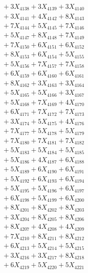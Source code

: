 \documentclass[a4paper,10pt]{article}
\begin{document}
{\begin{align}
&\;  + 3 X_{4138} + 3 X_{4139} + 3 X_{4140} \\[0.3ex]
&\;  + 3 X_{4141} + 4 X_{4142} + 8 X_{4143} \\[0.3ex]
&\;  + 7 X_{4144} + 5 X_{4145} + 7 X_{4146} \\[0.3ex]
&\;  + 5 X_{4147} + 8 X_{4148} + 7 X_{4149} \\[0.5ex]\allowbreak
&\;  + 7 X_{4150} + 6 X_{4151} + 6 X_{4152} \\[0.3ex]
&\;  + 8 X_{4153} + 6 X_{4154} + 5 X_{4155} \\[0.3ex]
&\;  + 5 X_{4156} + 7 X_{4157} + 7 X_{4158} \\[0.3ex]
&\;  + 6 X_{4159} + 6 X_{4160} + 6 X_{4161} \\[0.3ex]
&\;  + 8 X_{4162} + 3 X_{4163} + 3 X_{4164} \\[0.3ex]
&\;  + 5 X_{4165} + 5 X_{4166} + 3 X_{4167} \\[0.3ex]
&\;  + 5 X_{4168} + 7 X_{4169} + 4 X_{4170} \\[0.3ex]
&\;  + 6 X_{4171} + 7 X_{4172} + 7 X_{4173} \\[0.3ex]
&\;  + 3 X_{4174} + 5 X_{4175} + 4 X_{4176} \\[0.3ex]
&\;  + 7 X_{4177} + 5 X_{4178} + 5 X_{4179} \\[0.5ex]\allowbreak
&\;  + 7 X_{4180} + 7 X_{4181} + 7 X_{4182} \\[0.3ex]
&\;  + 5 X_{4183} + 5 X_{4184} + 5 X_{4185} \\[0.3ex]
&\;  + 5 X_{4186} + 4 X_{4187} + 6 X_{4188} \\[0.3ex]
&\;  + 5 X_{4189} + 6 X_{4190} + 6 X_{4191} \\[0.3ex]
&\;  + 5 X_{4192} + 6 X_{4193} + 6 X_{4194} \\[0.3ex]
&\;  + 5 X_{4195} + 5 X_{4196} + 6 X_{4197} \\[0.3ex]
&\;  + 6 X_{4198} + 5 X_{4199} + 6 X_{4200} \\[0.3ex]
&\;  + 8 X_{4201} + 8 X_{4202} + 8 X_{4203} \\[0.3ex]
&\;  + 3 X_{4204} + 8 X_{4205} + 8 X_{4206} \\[0.3ex]
&\;  + 8 X_{4207} + 4 X_{4208} + 4 X_{4209} \\[0.5ex]\allowbreak
&\;  + 7 X_{4210} + 8 X_{4211} + 8 X_{4212} \\[0.3ex]
&\;  + 6 X_{4213} + 5 X_{4214} + 5 X_{4215} \\[0.3ex]
&\;  + 3 X_{4216} + 3 X_{4217} + 8 X_{4218} \\[0.3ex]
&\;  + 6 X_{4219} + 5 X_{4220} + 5 X_{4221} \\[0.3ex]

\end{align}}
\end{document}
